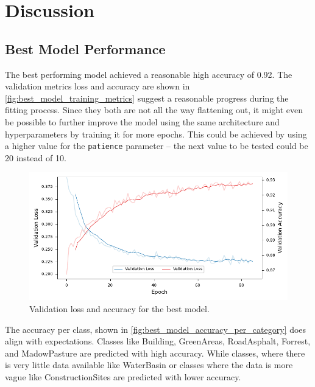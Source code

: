 


\section{Discussion}
\label{discussion}

\subsection{Best Model Performance}

The best performing model achieved a reasonable high accuracy of 0.92. The validation
metrics loss and accuracy are shown in \autoref{fig:best_model_training_metrics}
suggest a reasonable progress during the fitting process. Since they both are not
all the way flattening out, it might even be possible to further improve the model
using the same architecture and hyperparameters by training it for more epochs.
This could be achieved by using a higher value for the \texttt{patience} parameter --
the next value to be tested could be 20 instead of 10.

\begin{figure}[H]
    \centering
    \captionsetup{width=0.8\linewidth}
    \includegraphics{figures/best_model_training_metrics.pdf}
    \caption{Validation loss and accuracy for the best model.}
    \label{fig:best_model_training_metrics}
\end{figure}

The accuracy per class, shown in \autoref{fig:best_model_accuracy_per_category}
does align with expectations. Classes like Building, GreenAreas, RoadAsphalt, Forrest,
and MadowPasture are predicted with high accuracy. While classes, where there is
very little data available like WaterBasin or classes where the data is more vague
like ConstructionSites are predicted with lower accuracy.

